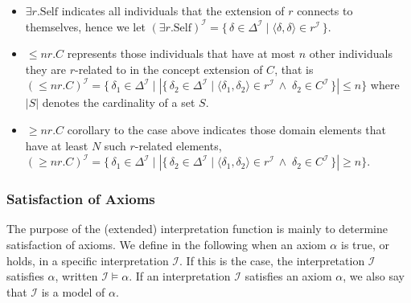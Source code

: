 \begin{itemize}
    \item $\exists r . \mathrm{Self}$ indicates all individuals that the extension of $r$ connects to themselves, hence we let $(\exists r . \mathrm{Self})^\mathcal{I} = \{ \, \delta \in \Delta^\mathcal{I} \mid \langle \delta, \delta \rangle \in r^\mathcal{I} \, \}$.
    \item $\leq n r . C$ represents those individuals that have at most $n$ other individuals they are $r$-related to in the concept extension of $C$, that is  $(\leq n r . C)^\mathcal{I} = \{ \, \delta_1 \in \Delta^\mathcal{I} \mid \left| \{ \, \delta_2 \in \Delta^\mathcal{I} \mid \langle \delta_1, \delta_2 \rangle \in r^\mathcal{I} \, \land \; \delta_2 \in C^\mathcal{I} \, \} \right| \leq n \}$ where $|S|$ denotes the cardinality of a set $S$.
    \item $\geq n r.C$ corollary to the case above indicates those domain elements that have at least $N$ such $r$-related elements, $(\geq n r . C)^\mathcal{I} = \{ \, \delta_1 \in \Delta^\mathcal{I} \mid \left| \{ \, \delta_2 \in \Delta^\mathcal{I} \mid \langle \delta_1, \delta_2 \rangle \in r^\mathcal{I} \, \land \; \delta_2 \in C^\mathcal{I} \, \} \right| \geq n \}$.
\end{itemize}

\subsubsection{Satisfaction of Axioms}

The purpose of the (extended) interpretation function is mainly to determine satisfaction of axioms. We define in the following when an axiom $\alpha$ is true, or holds, in a specific interpretation $\mathcal{I}$. If this is the case, the interpretation $\mathcal{I}$ satisfies $\alpha$, written $\mathcal{I} \vDash \alpha$. If an interpretation $\mathcal{I}$ satisfies an axiom $\alpha$, we also say that $\mathcal{I}$ is a model of $\alpha$.

